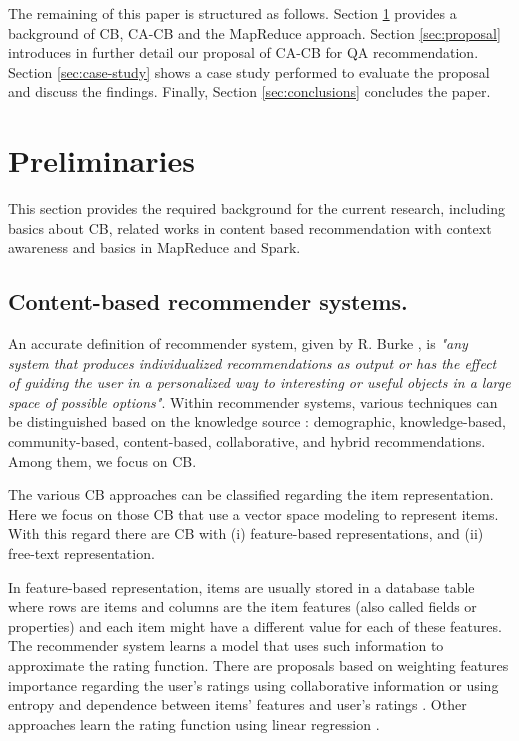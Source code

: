 \documentclass[preprint]{elsarticle}
\begin{document}
\begin{spacing}{1.5}
The remaining of this paper is structured as follows. Section \ref{sec:preliminaries} provides a background of CB, CA-CB and the MapReduce approach. Section \ref{sec:proposal} introduces in further detail our proposal of CA-CB for QA recommendation. Section \ref{sec:case-study} shows a case study performed to evaluate the proposal and discuss the findings. Finally, Section \ref{sec:conclusions} concludes the paper.

\section{Preliminaries}
\label{sec:preliminaries}

This section provides the required background for the current research, including basics about CB, related works in content based recommendation with context awareness and basics in MapReduce and Spark.

\subsection{Content-based recommender systems.}

An accurate definition of recommender system, given by R. Burke \cite{Burke2002}, is \emph{"any system that produces individualized recommendations as output or has the effect of guiding the user in a personalized way to interesting or useful objects in a large space of possible options"}. Within recommender systems, various techniques can be distinguished based on the knowledge source \cite{DePessemier2016}: demographic, knowledge-based, community-based, content-based, collaborative, and hybrid recommendations. Among them, we focus on CB.

The various CB approaches can be classified regarding the item representation. Here we focus on those CB that use a vector space modeling to represent items. With this regard there are CB with (i) feature-based representations, and (ii) free-text representation.

In feature-based representation, items are usually stored in a database table where rows are items and columns are the item features (also called fields or properties) and each item might have a different value for each of these features. The recommender system learns a model that uses such information to approximate the rating function. There are proposals based on weighting features importance regarding the user's ratings using collaborative information \cite{Symeonidis2007} or using entropy and dependence between items' features and user's ratings \cite{Castro2014}. Other approaches learn the rating function using linear regression \cite{DePessemier2016}.


\end{spacing}
\end{document}
